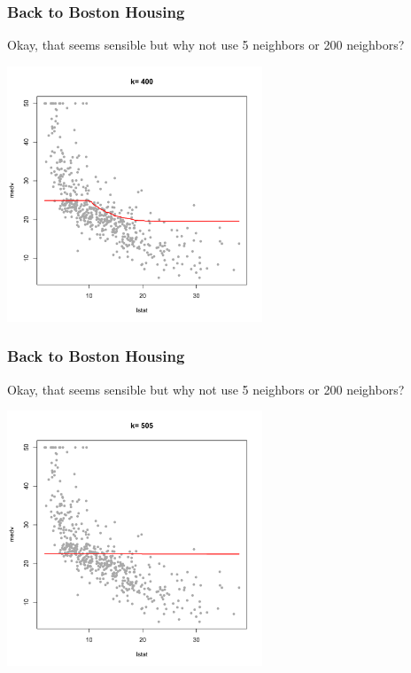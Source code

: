 \documentclass[flegn]{beamer}
\begin{document}
\begin{frame}
\frametitle{Back to Boston Housing}
{\color{blue}Okay, that seems sensible but why not use 5 neighbors or 200 neighbors? }

\vspace{-0.5cm}
\begin{center}
\includegraphics[width=3in]{k400}
\end{center}
\end{frame}

\begin{frame}
\frametitle{Back to Boston Housing}
{\color{blue}Okay, that seems sensible but why not use 5 neighbors or 200 neighbors? }

\vspace{-0.5cm}
\begin{center}
\includegraphics[width=3in]{k550}
\end{center}
\end{frame}
\end{document}
